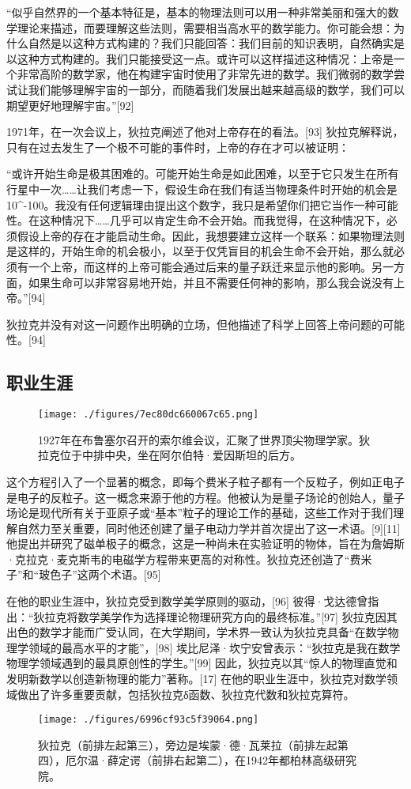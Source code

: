 “似乎自然界的一个基本特征是，基本的物理法则可以用一种非常美丽和强大的数学理论来描述，而要理解这些法则，需要相当高水平的数学能力。你可能会想：为什么自然是以这种方式构建的？我们只能回答：我们目前的知识表明，自然确实是以这种方式构建的。我们只能接受这一点。或许可以这样描述这种情况：上帝是一个非常高阶的数学家，他在构建宇宙时使用了非常先进的数学。我们微弱的数学尝试让我们能够理解宇宙的一部分，而随着我们发展出越来越高级的数学，我们可以期望更好地理解宇宙。”[92]  

1971年，在一次会议上，狄拉克阐述了他对上帝存在的看法。[93] 狄拉克解释说，只有在过去发生了一个极不可能的事件时，上帝的存在才可以被证明：

“或许开始生命是极其困难的。可能开始生命是如此困难，以至于它只发生在所有行星中一次……让我们考虑一下，假设生命在我们有适当物理条件时开始的机会是10^-100。我没有任何逻辑理由提出这个数字，我只是希望你们把它当作一种可能性。在这种情况下……几乎可以肯定生命不会开始。而我觉得，在这种情况下，必须假设上帝的存在才能启动生命。因此，我想要建立这样一个联系：如果物理法则是这样的，开始生命的机会极小，以至于仅凭盲目的机会生命不会开始，那么就必须有一个上帝，而这样的上帝可能会通过后来的量子跃迁来显示他的影响。另一方面，如果生命可以非常容易地开始，并且不需要任何神的影响，那么我会说没有上帝。”[94]  

狄拉克并没有对这一问题作出明确的立场，但他描述了科学上回答上帝问题的可能性。[94]
\subsection{职业生涯}
\begin{figure}[ht]
\centering
\texttt{[image: ./figures/7ec80dc660067c65.png]}
\caption{1927年在布鲁塞尔召开的索尔维会议，汇聚了世界顶尖物理学家。狄拉克位于中排中央，坐在阿尔伯特·爱因斯坦的后方。} \label{fig_DLK1_4}
\end{figure}
这个方程引入了一个显著的概念，即每个费米子粒子都有一个反粒子，例如正电子是电子的反粒子。这一概念来源于他的方程。他被认为是量子场论的创始人，量子场论是现代所有关于亚原子或“基本”粒子的理论工作的基础，这些工作对于我们理解自然力至关重要，同时他还创建了量子电动力学并首次提出了这一术语。[9][11] 他提出并研究了磁单极子的概念，这是一种尚未在实验证明的物体，旨在为詹姆斯·克拉克·麦克斯韦的电磁学方程带来更高的对称性。狄拉克还创造了“费米子”和“玻色子”这两个术语。[95]  

在他的职业生涯中，狄拉克受到数学美学原则的驱动，[96] 彼得·戈达德曾指出：“狄拉克将数学美学作为选择理论物理研究方向的最终标准。”[97] 狄拉克因其出色的数学才能而广受认同，在大学期间，学术界一致认为狄拉克具备“在数学物理学领域的最高水平的才能”，[98] 埃比尼泽·坎宁安曾表示：“狄拉克是我在数学物理学领域遇到的最具原创性的学生。”[99] 因此，狄拉克以其“惊人的物理直觉和发明新数学以创造新物理的能力”著称。[17] 在他的职业生涯中，狄拉克对数学领域做出了许多重要贡献，包括狄拉克δ函数、狄拉克代数和狄拉克算符。
\begin{figure}[ht]
\centering
\texttt{[image: ./figures/6996cf93c5f39064.png]}
\caption{狄拉克（前排左起第三），旁边是埃蒙·德·瓦莱拉（前排左起第四），厄尔温·薛定谔（前排右起第二），在1942年都柏林高级研究院。} \label{fig_DLK1_5}
\end{figure}
